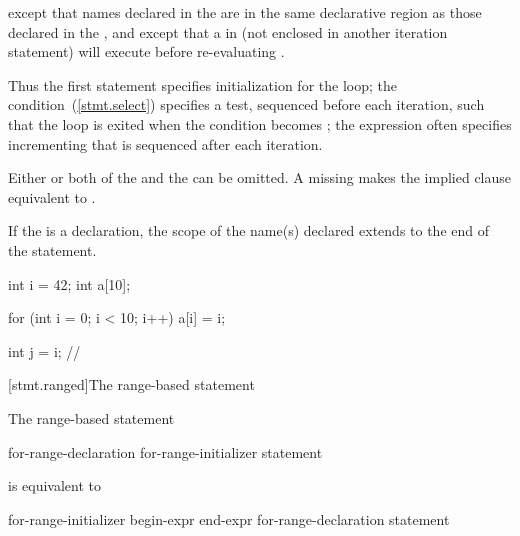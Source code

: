 except that names declared in the  are in
the same declarative region as those declared in the
, and except that a
%
 in  (not enclosed in another
iteration statement) will execute  before
re-evaluating .
\begin{note}
Thus the first statement specifies initialization for the loop; the
condition~(\ref{stmt.select}) specifies a test, sequenced before each
iteration, such that the loop is exited when the condition becomes
; the expression often specifies incrementing that is
sequenced after each iteration.
\end{note}

\pnum
Either or both of the 
and the  can be omitted.
A missing 
makes the implied  clause
equivalent to .

\pnum
{}%
%
If the  is a declaration, the scope of the
name(s) declared extends to the end of the  statement.
\begin{example}

\begin{codeblock}
int i = 42;
int a[10];

for (int i = 0; i < 10; i++)
  a[i] = i;

int j = i;          // 
\end{codeblock}
\end{example}

[stmt.ranged]{The range-based  statement}%

\pnum
The range-based  statement

\begin{ncbnf}
 for-range-declaration \terminal{:} for-range-initializer \terminal{)} statement
\end{ncbnf}

is equivalent to

\begin{ncbnftab}
\terminal{\{}\br
\> for-range-initializer \terminal{;}\br
\> begin-expr \terminal{;}\br
\> end-expr \terminal{;}\br
\>\br
\>\>for-range-declaration \br
\>\>statement\br
\>\terminal{\}}\br
\terminal{\}}
\end{ncbnftab}

